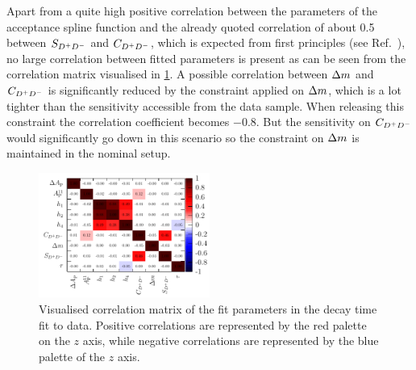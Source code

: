 Apart from a quite high positive correlation between the parameters of the
acceptance spline function and the already quoted correlation of about
\num{0.5} between $S_{{{D}^+}{{D}^-}}$ and $C_{{{D}^+}{{D}^-}}$, which is expected from first principles
(see Ref.~\cite{LHCb-ANA-2011-004}), no large correlation between fitted parameters
is present as can be seen from the correlation matrix visualised in
\cref{fig:b02dd:decaytimefit:FullFitCorrMatrixHotCold}. A possible correlation
between ${\Delta m}$ and $C_{{{D}^+}{{D}^-}}$ is significantly reduced by the constraint applied on ${\Delta m}$,
which is a lot tighter than the sensitivity accessible from the data sample.
When releasing this constraint the correlation coefficient becomes \num{-0.8}.
But the sensitivity on $C_{{{D}^+}{{D}^-}}$ would significantly go down in this scenario so
the constraint on ${\Delta m}$ is maintained in the nominal setup.

\begin{figure}[htb]
\centering
\includegraphics[width=0.5\textwidth]{07-B02DD/tikz/pdf/FitResultsCorrMatrix_RedBlueDiscrete_wText.pdf}
\caption{Visualised correlation matrix of the fit parameters in the decay time
fit to data. Positive correlations are represented by the red palette on the $z$ axis,
while negative correlations are represented by the blue palette of the $z$
axis.}
\label{fig:b02dd:decaytimefit:FullFitCorrMatrixHotCold}
\end{figure}

